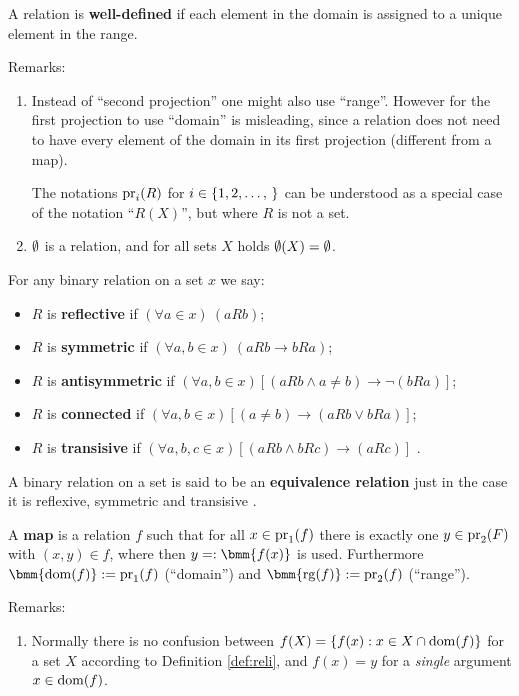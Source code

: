 \documentclass[12pt]{book}
\begin{document}
\begin{defi}\label{def:reli2}
      A relation is \textbf{well-defined} if each element in the domain is assigned to a unique element in the range.
\end{defi}	  
Remarks:
\begin{enumerate}
      \item Instead of ``second projection'' one might also use ``range''. However for the first projection to use ``domain'' is misleading, since 
	  a relation does not need to have every element of the domain in its first projection (different from a map).

      The notations $\operatorname{pr}_i(R)$ for $i \in \tb{1,2}$ can be understood as a special case of the notation ``$R(X)$'', but where $R$ is not a set.
      \item $\emptyset$ is a relation, and for all sets $X$ holds $\emptyset(X) = \emptyset$.
\end{enumerate}

\begin{defi}\label{def:binop}
      For any binary relation on a set $x$ we say:
	  \begin{itemize}
	        \item $R$ is \textbf{reflective} if $ (\forall a \in x) \ ( aRb)$;
			\item $R$ is \textbf{symmetric} if $ (\forall a,b \in x) \ ( aRb \rightarrow bRa)$;
			\item $R$ is \textbf{antisymmetric} if $ (\forall a,b \in x) [ ( aRb \wedge a \not = b)\rightarrow \neg (bRa)]$;
			\item $R$ is \textbf{connected} if $ (\forall a,b \in x) [(a \not = b) \rightarrow (aRb \vee bRa)]$;
			\item $R$ is \textbf{transisive} if $ (\forall a,b,c \in x) [ ( aRb \wedge bRc) \rightarrow (aRc)]$ \cite{h1}.
	  \end{itemize}
\end{defi}

A binary relation on a set is said to be an \textbf{equivalence relation} just in the case it is reflexive, symmetric and transisive \cite{h1}.

\begin{defi}\label{def:map}
      A \textbf{map} is a relation $f$ such that for all $x \in \operatorname{pr}_1(f)$ there is exactly one $y \in \operatorname{pr}_2(F)$ with $(x,y) \in f$, where then 
	  $y =: \bmm{f(x)}$ is used. Furthermore $\bmm{\dom(f)} := \proj_1(f)$ (``domain'') and $\bmm{\rg(f)} := \proj_2(f)$ (``range'').
\end{defi}
Remarks:
\begin{enumerate}
      \item Normally there is no confusion between $f(X) = \{ f(x) : x \in X \cap \operatorname{dom}(f) \}$ for a set $X$ according to Definition \ref{def:reli}, 
	  and $f(x) = y$ for a \emph{single} argument $x \in \operatorname{dom}(f)$.
\end{enumerate}
\end{document}
